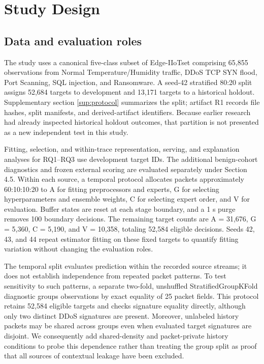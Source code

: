 \documentclass[final,3p,10pt,nopreprintline]{elsarticle}
\begin{document}
\section{Study Design}

\subsection{Data and evaluation roles}

The study uses a canonical five-class subset of Edge-IIoTset comprising 65,855 observations from Normal Temperature/Humidity traffic, DDoS TCP SYN flood, Port Scanning, SQL injection, and Ransomware. A seed-42 stratified 80:20 split assigns 52,684 targets to development and 13,171 targets to a historical holdout. Supplementary section \ref*{sup:protocol} summarizes the split; artifact R1 records file hashes, split manifests, and derived-artifact identifiers. Because earlier research had already inspected historical holdout outcomes, that partition is not presented as a new independent test in this study.

Fitting, selection, and within-trace representation, serving, and explanation analyses for RQ1--RQ3 use development target IDs. The additional benign-cohort diagnostics and frozen external scoring are evaluated separately under Section 4.5. Within each source, a temporal protocol allocates packets approximately 60:10:10:20 to A for fitting preprocessors and experts, G for selecting hyperparameters and ensemble weights, C for selecting expert order, and V for evaluation. Buffer states are reset at each stage boundary, and a 1 s purge removes 100 boundary decisions. The remaining target counts are A = 31,676, G = 5,360, C = 5,190, and V = 10,358, totaling 52,584 eligible decisions. Seeds 42, 43, and 44 repeat estimator fitting on these fixed targets to quantify fitting variation without changing the evaluation roles.

The temporal split evaluates prediction within the recorded source streams; it does not establish independence from repeated packet patterns. To test sensitivity to such patterns, a separate two-fold, unshuffled StratifiedGroupKFold diagnostic groups observations by exact equality of 25 packet fields. This protocol retains 52,584 eligible targets and checks signature equality directly, although only two distinct DDoS signatures are present. Moreover, unlabeled history packets may be shared across groups even when evaluated target signatures are disjoint. We consequently add shared-density and packet-private history conditions to probe this dependence rather than treating the group split as proof that all sources of contextual leakage have been excluded.
\end{document}
